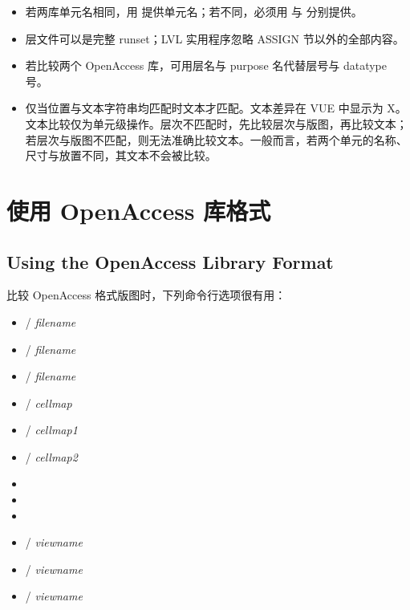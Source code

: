 {\footnotesize
\begin{itemize}[leftmargin=1.5em,nosep]
  \item[$^{a}$] 若两库单元名相同，用  提供单元名；若不同，必须用  与  分别提供。
  \item[$^{b}$] 层文件可以是完整 runset；LVL 实用程序忽略 ASSIGN 节以外的全部内容。
  \item[$^{c}$] 若比较两个 OpenAccess 库，可用层名与 purpose 名代替层号与 datatype 号。
  \item[$^{d}$] 仅当位置与文本字符串均匹配时文本才匹配。文本差异在 VUE 中显示为 X。文本比较仅为单元级操作。层次不匹配时，先比较层次与版图，再比较文本；若层次与版图不匹配，则无法准确比较文本。一般而言，若两个单元的名称、尺寸与放置不同，其文本不会被比较。
\end{itemize}
}

\section{使用 OpenAccess 库格式}
\subsection*{Using the OpenAccess Library Format}

比较 OpenAccess 格式版图时，下列命令行选项很有用：
\begin{itemize}
  \item {} /  \textit{filename}
  \item {} /  \textit{filename}
  \item {} /  \textit{filename}
  \item {} /  \textit{cellmap}
  \item {} /  \textit{cellmap1}
  \item {} /  \textit{cellmap2}
  \item {}
  \item {}
  \item {}
  \item {} /  \textit{viewname}
  \item {} /  \textit{viewname}
  \item {} /  \textit{viewname}
\end{itemize}

